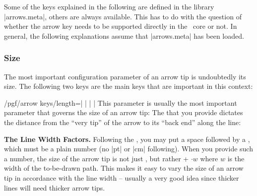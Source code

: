 Some of the keys explained in the following are defined in the library
|arrows.meta|, others are always available. This has to do with the question of
whether the arrow key needs to be supported directly in the \pgfname\ core or
not. In general, the following explanations assume that |arrows.meta| has been
loaded.


\subsubsection{Size}

The most important configuration parameter of an arrow tip is undoubtedly its
size. The following two keys are the main keys that are important in this
context:

\begin{key}{/pgf/arrow keys/length=| |%
        | |}
        \label{length-arrow-key}%
    This parameter is usually the most important parameter that governs the
    size of an arrow tip: The  that you provide dictates the
    distance from the ``very tip'' of the arrow to its ``back end'' along the
    line:
\begin{codeexample}[preamble={\usetikzlibrary{arrows.meta}}]
\end{codeexample}
\begin{codeexample}[preamble={\usetikzlibrary{arrows.meta}}]
\end{codeexample}
\begin{codeexample}[preamble={\usetikzlibrary{arrows.meta}}]
\end{codeexample}

    \medskip
    \noindent \textbf{The Line Width Factors.}
    Following the , you may put a space followed by a
    , which must be a plain number (no |pt| or |cm|
    following). When you provide such a number, the size of the arrow tip is
    not just , but rather  +  $\cdot w$ where $w$ is the width of the to-be-drawn path. This makes
    it easy to vary the size of an arrow tip in accordance with the line width
    -- usually a very good idea since thicker lines will need thicker arrow
    tips.


\end{key}
